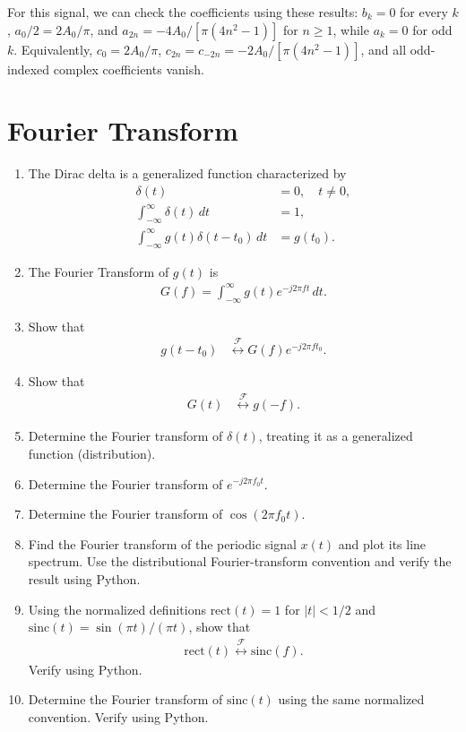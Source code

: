 \documentclass[journal,12pt,twocolumn]{IEEEtran}
\renewcommand\thesection{\arabic{section}}
\theoremstyle{definition}
\providecommand{\rect}[1]{\text{rect}\ensuremath{\left(#1\right)}}
\providecommand{\sinc}[1]{\text{sinc}\ensuremath{\left(#1\right)}}
\theoremstyle{remark}
\providecommand{\system}[1]{\overset{\mathcal{#1}}{\longleftrightarrow}}
\numberwithin{equation}{section}
\begin{document}
For this signal, we can check the coefficients using these results:
$b_k=0$ for every $k$, $a_0/2=2A_0/\pi$, and
$a_{2n}=-4A_0/[\pi(4n^2-1)]$ for $n\geq1$, while $a_k=0$
for odd $k$. Equivalently, $c_0=2A_0/\pi$,
$c_{2n}=c_{-2n}=-2A_0/[\pi(4n^2-1)]$, and all odd-indexed
complex coefficients vanish.

\FloatBarrier
\section{Fourier Transform}
\begin{enumerate}[label=\thesection.\arabic*,
                  ref=\thesection.\theenumi]
    \item The Dirac delta is a generalized function characterized by
    \begin{align}
        \delta(t)&=0,\quad t\neq 0,\\
        \int_{-\infty}^{\infty}\delta(t)\,dt&=1,\\
        \int_{-\infty}^{\infty}g(t)\delta(t-t_0)\,dt&=g(t_0).
    \end{align}

    \item The Fourier Transform of $g(t)$ is
    \begin{align}
        G(f)=\int_{-\infty}^{\infty}g(t)e^{-j2\pi ft}\,dt.
    \end{align}

    \item Show that
    \begin{align}
        g(t-t_0)&\system{F}G(f)e^{-j2\pi ft_0}.
    \end{align}

    \item Show that
    \begin{align}
        G(t)&\system{F}g(-f).
    \end{align}

    \item Determine the Fourier transform of $\delta(t)$, treating it as a generalized function (distribution).

    \item Determine the Fourier transform of $e^{-j2\pi f_0t}$.

    \item Determine the Fourier transform of $\cos(2\pi f_0t)$.

    \item Find the Fourier transform of the periodic signal $x(t)$ and plot its line spectrum.
    Use the distributional Fourier-transform convention and verify the result using Python.

    \item Using the normalized definitions
    $\rect{t}=1$ for $|t|<1/2$ and 
    $\sinc{t}=\sin(\pi t)/(\pi t)$, show that
    \begin{align}
        \rect{t}\system{F}\sinc{f}.
    \end{align}
    Verify using Python.

    \item Determine the Fourier transform of $\sinc{t}$ using the same normalized convention.
    Verify using Python.
\end{enumerate}
\end{document}

